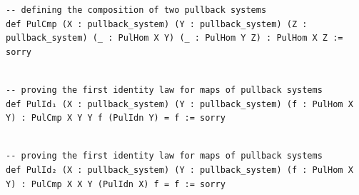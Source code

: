 \documentclass{book}
\theoremstyle{definition}
\newcounter{lcounter}
\begin{document}
{{\begin{center}
\begin{tcolorbox}[width=5in,colback={white},title={\begin{center}\texttt{Lean \thelcounter} \addtocounter{lcounter}{1}  \end{center}},colbacktitle=Blue,coltitle=black]
\begin{verbatim}
-- defining the composition of two pullback systems
def PulCmp (X : pullback_system) (Y : pullback_system) (Z : pullback_system) (_ : PulHom X Y) (_ : PulHom Y Z) : PulHom X Z := sorry

\end{verbatim}
\end{tcolorbox}
\end{center}


\begin{center}
\begin{tcolorbox}[width=5in,colback={white},title={\begin{center}\texttt{Lean \thelcounter} \addtocounter{lcounter}{1}  \end{center}},colbacktitle=Blue,coltitle=black]
\begin{verbatim}

-- proving the first identity law for maps of pullback systems
def PulId₁ (X : pullback_system) (Y : pullback_system) (f : PulHom X Y) : PulCmp X Y Y f (PulIdn Y) = f := sorry

\end{verbatim}
\end{tcolorbox}
\end{center}


\begin{center}
\begin{tcolorbox}[width=5in,colback={white},title={\begin{center}\texttt{Lean \thelcounter} \addtocounter{lcounter}{1}  \end{center}},colbacktitle=Blue,coltitle=black]
\begin{verbatim}

-- proving the first identity law for maps of pullback systems
def PulId₂ (X : pullback_system) (Y : pullback_system) (f : PulHom X Y) : PulCmp X X Y (PulIdn X) f = f := sorry

\end{verbatim}
\end{tcolorbox}
\end{center}


\begin{center}
\begin{tcolorbox}[width=5in,colback={white},title={\begin{center}\texttt{Lean \thelcounter} \addtocounter{lcounter}{1}  \end{center}},colbacktitle=Blue,coltitle=black]
\begin{verbatim}


\end{verbatim}
\end{tcolorbox}
\end{center}}}
\end{document}
